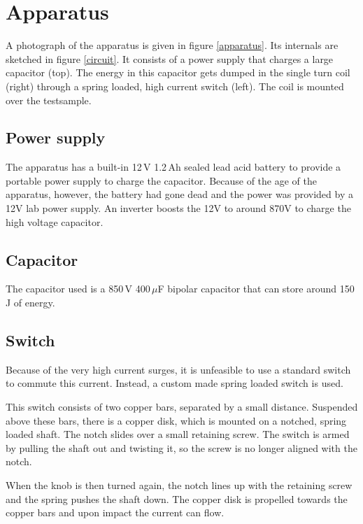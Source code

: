 \section{Apparatus}


A photograph of the apparatus is given in figure \ref{apparatus}. Its 
internals are sketched in figure \ref{circuit}. It consists of a power 
supply that charges a large capacitor (top).  The energy in this capacitor 
gets dumped in the single turn coil (right) through a spring loaded, high 
current switch (left). The coil is mounted over the testsample.



\subsection{Power supply}
The apparatus has a built-in 12\,V 1.2\,Ah sealed lead acid battery to provide 
a portable power supply to charge the capacitor. Because of the age of the 
apparatus, however, the battery had gone dead and the power was provided by a 
12V lab power supply. An inverter boosts the 12V to around 870V to charge the 
high voltage capacitor.


\subsection{Capacitor}
The capacitor used is a 850\,V 400\,$\mu$F bipolar capacitor that can store 
around 150\,J of energy.


\subsection{Switch}
Because of the very high current surges, it is unfeasible to use a standard 
switch to commute this current. Instead, a custom made spring loaded switch is 
used.

This switch consists of two copper bars, separated by a small distance.  
Suspended above these bars, there is a copper disk, which is mounted on a 
notched, spring loaded shaft. The notch slides over a small retaining screw.  
The switch is armed by pulling the shaft out and twisting it, so the screw is 
no longer aligned with the notch.

When the knob is then turned again, the notch lines up with the retaining 
screw and the spring pushes the shaft down. The copper disk is propelled 
towards the copper bars and upon impact the current can flow.

